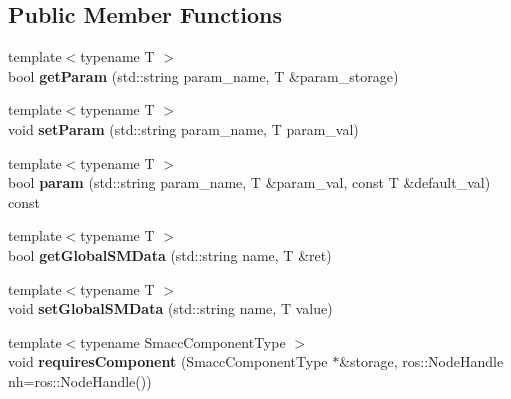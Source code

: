 \subsection*{Public Member Functions}
\begin{DoxyCompactItemize}
\item 
{\footnotesize template$<$typename T $>$ }\\bool {\bfseries get\+Param} (std\+::string param\+\_\+name, T \&param\+\_\+storage)\hypertarget{classsmacc_1_1SmaccState_aa5f455c4336d18ce25a4e0f42a5b122b}{}\label{classsmacc_1_1SmaccState_aa5f455c4336d18ce25a4e0f42a5b122b}

\item 
{\footnotesize template$<$typename T $>$ }\\void {\bfseries set\+Param} (std\+::string param\+\_\+name, T param\+\_\+val)\hypertarget{classsmacc_1_1SmaccState_ab554e83f5d07ce4efe53d8bcaeb0693a}{}\label{classsmacc_1_1SmaccState_ab554e83f5d07ce4efe53d8bcaeb0693a}

\item 
{\footnotesize template$<$typename T $>$ }\\bool {\bfseries param} (std\+::string param\+\_\+name, T \&param\+\_\+val, const T \&default\+\_\+val) const \hypertarget{classsmacc_1_1SmaccState_a714ab02987bd253796336d465de74328}{}\label{classsmacc_1_1SmaccState_a714ab02987bd253796336d465de74328}

\item 
{\footnotesize template$<$typename T $>$ }\\bool {\bfseries get\+Global\+S\+M\+Data} (std\+::string name, T \&ret)\hypertarget{classsmacc_1_1SmaccState_ad53b5be2760eb7ffb50f3b2e542b65f1}{}\label{classsmacc_1_1SmaccState_ad53b5be2760eb7ffb50f3b2e542b65f1}

\item 
{\footnotesize template$<$typename T $>$ }\\void {\bfseries set\+Global\+S\+M\+Data} (std\+::string name, T value)\hypertarget{classsmacc_1_1SmaccState_a98f2673b257479e0a3615d5d8279a591}{}\label{classsmacc_1_1SmaccState_a98f2673b257479e0a3615d5d8279a591}

\item 
{\footnotesize template$<$typename Smacc\+Component\+Type $>$ }\\void {\bfseries requires\+Component} (Smacc\+Component\+Type $\ast$\&storage, ros\+::\+Node\+Handle nh=ros\+::\+Node\+Handle())\hypertarget{classsmacc_1_1SmaccState_a880a01f691136de365749c2e035d5127}{}\label{classsmacc_1_1SmaccState_a880a01f691136de365749c2e035d5127}


\end{DoxyCompactItemize}
